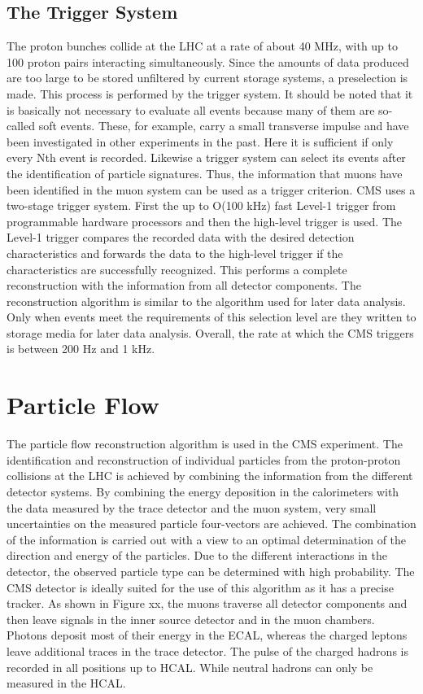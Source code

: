 \documentclass[12pt, a4paper]{thesis}
\begin{document}
\subsection{The Trigger System}
\label{sec:org9d9e9a7}
The proton bunches collide at the LHC at a rate of about 40 MHz, with up to 100
proton pairs interacting simultaneously. Since the amounts of data produced are
too large to be stored unfiltered by current storage systems, a preselection is
made. This process is performed by the trigger system. It should be noted that
it is basically not necessary to evaluate all events because many of them are
so-called soft events. These, for example, carry a small transverse impulse and
have been investigated in other experiments in the past. Here it is sufficient
if only every Nth event is recorded. Likewise a trigger system can select its
events after the identification of particle signatures. Thus, the information
that muons have been identified in the muon system can be used as a trigger
criterion. CMS uses a two-stage trigger system. First the up to O(100 kHz) fast
Level-1 trigger from programmable hardware processors and then the high-level
trigger is used. The Level-1 trigger compares the recorded data with the desired
detection characteristics and forwards the data to the high-level trigger if the
characteristics are successfully recognized. This performs a complete
reconstruction with the information from all detector components. The
reconstruction algorithm is similar to the algorithm used for later data
analysis. Only when events meet the requirements of this selection level are
they written to storage media for later data analysis. Overall, the rate at
which the CMS triggers is between 200 Hz and 1 kHz.

\section{Particle Flow}
\label{sec:org5293ff6}

The particle flow reconstruction algorithm is used in the CMS experiment. The
identification and reconstruction of individual particles from the proton-proton
collisions at the LHC is achieved by combining the information from the
different detector systems. By combining the energy deposition in the
calorimeters with the data measured by the trace detector and the muon system,
very small uncertainties on the measured particle four-vectors are achieved. The
combination of the information is carried out with a view to an optimal
determination of the direction and energy of the particles. Due to the different
interactions in the detector, the observed particle type can be determined with
high probability.  The CMS detector is ideally suited for the use of this
algorithm as it has a precise tracker. As shown in Figure xx, the muons traverse
all detector components and then leave signals in the inner source detector and
in the muon chambers. Photons deposit most of their energy in the ECAL, whereas
the charged leptons leave additional traces in the trace detector. The pulse of
the charged hadrons is recorded in all positions up to HCAL. While neutral
hadrons can only be measured in the HCAL.
\end{document}

